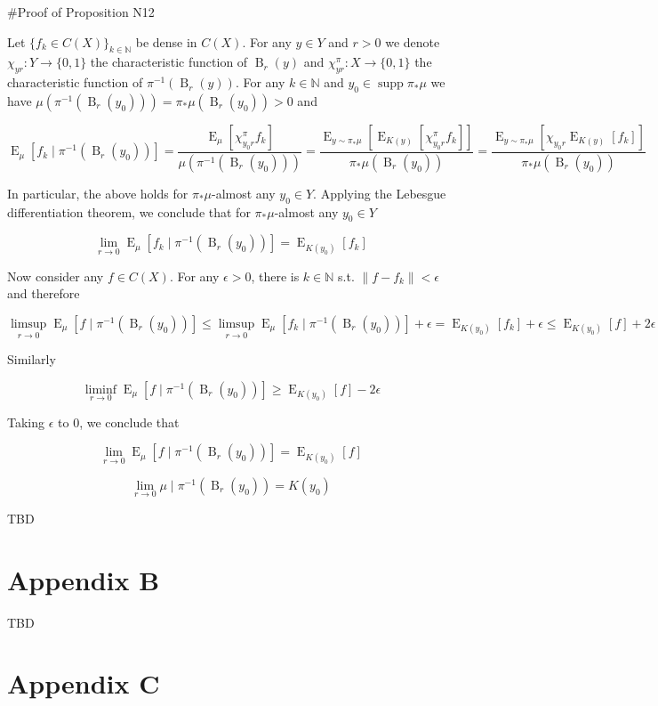 \documentclass[a4paper]{article}
\newcommand{\Bool}{\{0,1\}}
\DeclareMathOperator{\Supp}{supp}
\DeclareMathOperator{\E}{E}
\newcommand{\Nats}{\mathbb{N}}
\newcommand{\Sq}[2]{\{#1\}_{#2 \in \Nats}}
\newcommand{\Norm}[1]{\lVert #1 \rVert}
\newcommand{\Ball}{\operatorname{B}}
\begin{document}
\#Proof of Proposition N12

Let $\Sq{f_k \in C(X)}{k}$ be dense in $C(X)$. For any $y \in Y$ and $r > 0$ we denote $\chi_{yr}: Y \rightarrow \Bool$ the characteristic function of $\Ball_r(y)$ and $\chi^\pi_{yr}: X \rightarrow \Bool$ the characteristic function of $\pi^{-1}(\Ball_r(y))$. For any $k \in \Nats$ and $y_0 \in \Supp \pi_* \mu$ we have $\mu(\pi^{-1}(\Ball_r(y_0))) = \pi_*\mu(\Ball_r(y_0)) > 0$ and

$$\E_{\mu}[f_k \mid \pi^{-1}(\Ball_r(y_0))] = \frac{\E_{\mu}[\chi^\pi_{y_0r} f_k]}{\mu(\pi^{-1}(\Ball_r(y_0)))} = \frac{\E_{y \sim \pi_* \mu}[\E_{K(y)}[\chi^\pi_{y_0r} f_k]]}{\pi_*\mu(\Ball_r(y_0))} = \frac{\E_{y \sim \pi_* \mu}[\chi_{y_0r} \E_{K(y)}[f_k]]}{\pi_*\mu(\Ball_r(y_0))}$$

In particular, the above holds for $\pi_* \mu$-almost any $y_0 \in Y$. Applying the Lebesgue differentiation theorem, we conclude that for $\pi_* \mu$-almost any $y_0 \in Y$

$$\lim_{r \rightarrow 0} \E_{\mu}[f_k \mid \pi^{-1}(\Ball_r(y_0))] = \E_{K(y_0)}[f_k]$$

Now consider any $f \in C(X)$. For any $\epsilon > 0$, there is $k \in \Nats$ s.t. $\Norm{f-f_k} < \epsilon$ and therefore

$$\limsup_{r \rightarrow 0} \E_{\mu}[f \mid \pi^{-1}(\Ball_r(y_0))] \leq \limsup_{r \rightarrow 0} \E_{\mu}[f_k \mid \pi^{-1}(\Ball_r(y_0))] + \epsilon = \E_{K(y_0)}[f_k] + \epsilon  \leq \E_{K(y_0)}[f] + 2\epsilon$$

Similarly

$$\liminf_{r \rightarrow 0} \E_{\mu}[f \mid \pi^{-1}(\Ball_r(y_0))] \geq \E_{K(y_0)}[f] - 2\epsilon$$

Taking $\epsilon$ to 0, we conclude that

$$\lim_{r \rightarrow 0} \E_{\mu}[f \mid \pi^{-1}(\Ball_r(y_0))] = \E_{K(y_0)}[f]$$

$$\lim_{r \rightarrow 0} \mu \mid \pi^{-1}(\Ball_r(y_0)) = K(y_0)$$

TBD

\section{Appendix B}

TBD

\section{Appendix C}
\end{document}
